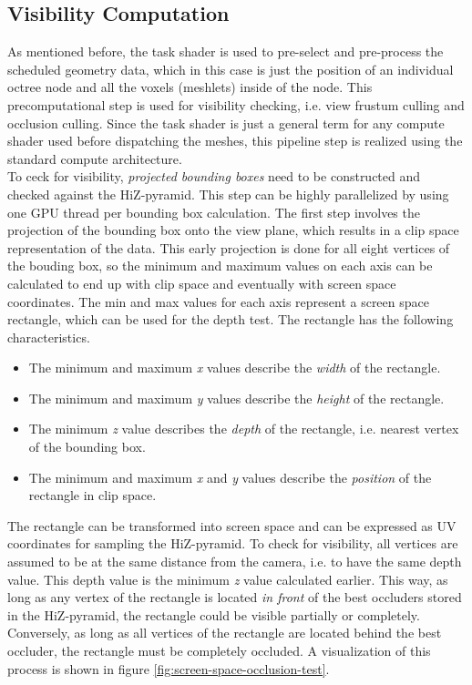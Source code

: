 \subsection*{Visibility Computation} \label{subsec-visibility-computation}

As mentioned before, the task shader is used to pre-select and pre-process the scheduled geometry data, 
which in this case is just the position of an individual octree node and all the voxels (meshlets) inside of the 
node. This precomputational step is used for visibility checking, i.e. view frustum culling and occlusion culling. 
Since the task shader is just a general term for any compute shader used before dispatching the meshes, 
this pipeline step is realized using the standard compute architecture. \\

\noindent
To ceck for visibility, \emph{projected bounding boxes} need to be constructed and checked against the 
\ac{HiZ}-pyramid. This step can be highly parallelized by using one \ac{GPU} thread per bounding box calculation. 
The first step involves the projection of the bounding box onto the view plane, which results in a clip space 
representation of the data. This early projection is done for all eight vertices of the bouding box, so the minimum 
and maximum values on each axis can be calculated to end up with clip space and eventually with screen space coordinates.
The min and max values for each axis represent a screen space rectangle, which can be used for the depth test. The 
rectangle has the following characteristics.

\begin{itemize}
    \item The minimum and maximum \emph{x} values describe the \emph{width} of the rectangle.
    \item The minimum and maximum \emph{y} values describe the \emph{height} of the rectangle.
    \item The minimum \emph{z} value describes the \emph{depth} of the rectangle, i.e. nearest vertex of the bounding box.
    \item The minimum and maximum \emph{x} and \emph{y} values describe the \emph{position} of the rectangle in clip space.
\end{itemize}

The rectangle can be transformed into screen space and can be expressed as UV coordinates for sampling the 
\ac{HiZ}-pyramid. To check for visibility, all vertices are assumed to be at the same distance from the camera,
i.e. to have the same depth value. This depth value is the minimum \emph{z} value calculated earlier. This way,
as long as any vertex of the rectangle is located \emph{in front} of the best occluders stored in the 
\ac{HiZ}-pyramid, the rectangle could be visible partially or completely. Conversely, as long as all vertices of 
the rectangle are located behind the best occluder, the rectangle must be completely occluded. A visualization of 
this process is shown in figure \ref{fig:screen-space-occlusion-test}.

